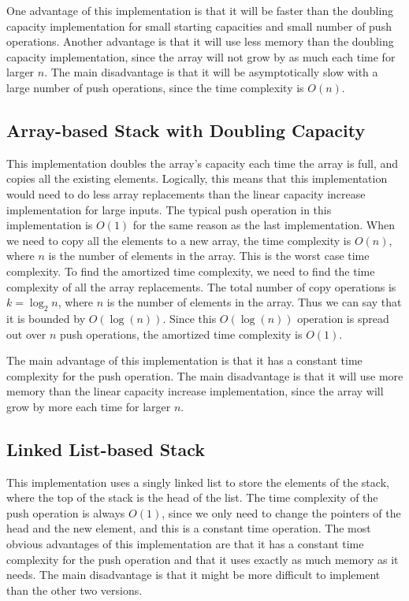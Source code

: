 \documentclass{article}
\begin{document}
One advantage of this implementation is that it will be faster than the doubling capacity implementation for small starting capacities and small number of push operations. 
Another advantage is that it will use less memory than the doubling capacity implementation, since the array will not grow by as much each time for larger $n$.
The main disadvantage is that it will be asymptotically slow with a large number of push operations, since the time complexity is $O(n)$.

\subsection{Array-based Stack with Doubling Capacity}
This implementation doubles the array's capacity each time the array is full, and copies all the existing elements. 
Logically, this means that this implementation would need to do less array replacements than the linear capacity increase implementation for large inputs. 
The typical push operation in this implementation is $O(1)$ for the same reason as the last implementation.
When we need to copy all the elements to a new array, the time complexity is $O(n)$, where $n$ is the number of elements in the array. 
This is the worst case time complexity.
To find the amortized time complexity, we need to find the time complexity of all the array replacements.
The total number of copy operations is $k = \log_2 n$, where $n$ is the number of elements in the array.
Thus we can say that it is bounded by $O(\log(n))$.
Since this $O(\log(n))$ operation is spread out over $n$ push operations, the amortized time complexity is $O(1)$.

The main advantage of this implementation is that it has a constant time complexity for the push operation.
The main disadvantage is that it will use more memory than the linear capacity increase implementation, since the array will grow by more each time for larger $n$.

\subsection{Linked List-based Stack}
This implementation uses a singly linked list to store the elements of the stack, where the top of the stack is the head of the list.
The time complexity of the push operation is always $O(1)$, since we only need to change the pointers of the head and the new element, and this is a constant time operation.
The most obvious advantages of this implementation are that it has a constant time complexity for the push operation and that it uses exactly as much memory as it needs. 
The main disadvantage is that it might be more difficult to implement than the other two versions.
\end{document}
